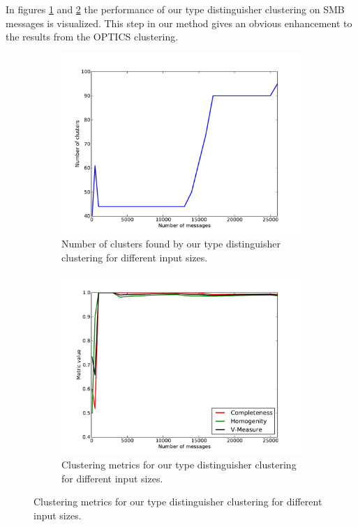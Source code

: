 \documentclass[a4paper]{report}
\begin{document}
In figures \ref{fig:num_td} and \ref{fig:metrics_td} the performance of our
type distinguisher clustering on SMB messages is visualized. This step in
our method gives an obvious enhancement to the results from the OPTICS
clustering.

\begin{figure}[h]
    \centering
    \begin{subfigure}[t]{0.48\textwidth}
        \includegraphics[width=\textwidth]{num_td}
        \caption{Number of clusters found by our type distinguisher clustering
            for different input sizes.}
        \label{fig:num_td}
    \end{subfigure}
    \quad
    \begin{subfigure}[t]{0.48\textwidth}
        \includegraphics[width=\textwidth]{metrics_td}
        \caption{Clustering metrics for our type distinguisher clustering for
            different input sizes.}
        \label{fig:metrics_td}
    \end{subfigure}
    \label{fig:td_res}
\end{figure}
\end{document}
